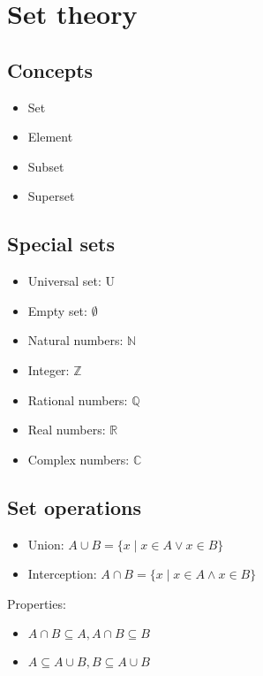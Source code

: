 \documentclass{book}
\begin{document}
\chapter{Set theory}

\section{Concepts}

\begin{itemize}
  \item Set
  \item Element
  \item Subset
  \item Superset
\end{itemize}

\section{Special sets}

\begin{itemize}
  \item Universal set: U
  \item Empty set: $\emptyset$
  \item Natural numbers: $\mathbb{N}$
  \item Integer: $\mathbb{Z}$
  \item Rational numbers: $\mathbb{Q}$
  \item Real numbers: $\mathbb{R}$
  \item Complex numbers: $\mathbb{C}$
\end{itemize}

\section{Set operations}

\begin{itemize}
  \item Union:        $A \cup B = \{ x \mid x \in A \lor x \in B \}$
  \item Interception: $A \cap B = \{ x \mid x \in A \land x \in B \}$
\end{itemize}

Properties:
\begin{itemize}
  \item $A \cap B \subseteq A, A \cap B \subseteq B$
  \item $A \subseteq A \cup B, B \subseteq A \cup B$
\end{itemize}
\end{document}
